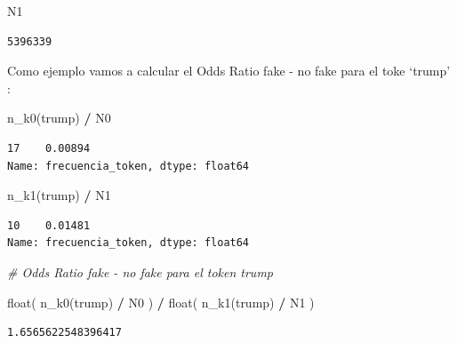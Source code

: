 \documentclass[
  11pt,
  a4paper,
]{article}
\newenvironment{Shaded}{\begin{snugshade}}{\end{snugshade}}
\newcommand{\BuiltInTok}[1]{#1}
\newcommand{\CommentTok}[1]{\textcolor[rgb]{0.56,0.35,0.01}{\textit{#1}}}
\newcommand{\NormalTok}[1]{#1}
\newcommand{\OperatorTok}[1]{\textcolor[rgb]{0.81,0.36,0.00}{\textbf{#1}}}
\newcommand{\StringTok}[1]{\textcolor[rgb]{0.31,0.60,0.02}{#1}}
\begin{document}
\begin{Shaded}
\begin{Highlighting}[]
\NormalTok{N1}
\end{Highlighting}
\end{Shaded}

\begin{verbatim}
5396339
\end{verbatim}

Como ejemplo vamos a calcular el Odds Ratio fake - no fake para el toke
`trump' :

\begin{Shaded}
\begin{Highlighting}[]
\NormalTok{n\_k0(}\StringTok{\textquotesingle{}trump\textquotesingle{}}\NormalTok{) }\OperatorTok{/}\NormalTok{ N0 }
\end{Highlighting}
\end{Shaded}

\begin{verbatim}
17    0.00894
Name: frecuencia_token, dtype: float64
\end{verbatim}

\begin{Shaded}
\begin{Highlighting}[]
\NormalTok{n\_k1(}\StringTok{\textquotesingle{}trump\textquotesingle{}}\NormalTok{) }\OperatorTok{/}\NormalTok{ N1}
\end{Highlighting}
\end{Shaded}

\begin{verbatim}
10    0.01481
Name: frecuencia_token, dtype: float64
\end{verbatim}

\begin{Shaded}
\begin{Highlighting}[]
\CommentTok{\# Odds Ratio fake {-} no fake para el token \textquotesingle{}trump\textquotesingle{}}

\BuiltInTok{float}\NormalTok{( n\_k0(}\StringTok{\textquotesingle{}trump\textquotesingle{}}\NormalTok{) }\OperatorTok{/}\NormalTok{ N0 ) }\OperatorTok{/} \BuiltInTok{float}\NormalTok{( n\_k1(}\StringTok{\textquotesingle{}trump\textquotesingle{}}\NormalTok{) }\OperatorTok{/}\NormalTok{ N1 )}
\end{Highlighting}
\end{Shaded}

\begin{verbatim}
1.6565622548396417
\end{verbatim}
\end{document}

